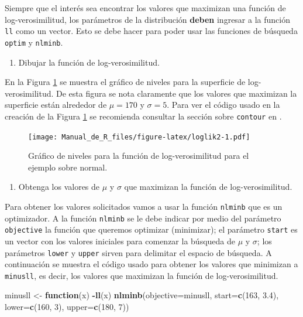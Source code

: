 \documentclass[10pt,]{krantz}
\makeatletter
\newenvironment{Shaded}{\begin{snugshade}}{\end{snugshade}}
\newcommand{\KeywordTok}[1]{\textcolor[rgb]{0.13,0.29,0.53}{\textbf{#1}}}
\newcommand{\DataTypeTok}[1]{\textcolor[rgb]{0.13,0.29,0.53}{#1}}
\newcommand{\DecValTok}[1]{\textcolor[rgb]{0.00,0.00,0.81}{#1}}
\newcommand{\FloatTok}[1]{\textcolor[rgb]{0.00,0.00,0.81}{#1}}
\newcommand{\StringTok}[1]{\textcolor[rgb]{0.31,0.60,0.02}{#1}}
\newcommand{\ControlFlowTok}[1]{\textcolor[rgb]{0.13,0.29,0.53}{\textbf{#1}}}
\newcommand{\OperatorTok}[1]{\textcolor[rgb]{0.81,0.36,0.00}{\textbf{#1}}}
\newcommand{\NormalTok}[1]{#1}
\providecommand{\tightlist}{%
  \setlength{\itemsep}{0pt}\setlength{\parskip}{0pt}}
\newenvironment{kframe}{%
\medskip{}
\setlength{\fboxsep}{.8em}
 \def\at@end@of@kframe{}%
 \ifinner\ifhmode%
  \def\at@end@of@kframe{\end{minipage}}%
  \begin{minipage}{\columnwidth}%
 \fi\fi%
 \def\FrameCommand##1{\hskip\@totalleftmargin \hskip-\fboxsep
 \colorbox{shadecolor}{##1}\hskip-\fboxsep
     \hskip-\linewidth \hskip-\@totalleftmargin \hskip\columnwidth}%
 \MakeFramed {\advance\hsize-\width
   \@totalleftmargin\z@ \linewidth\hsize
   \@setminipage}}%
 {\par\unskip\endMakeFramed%
 \at@end@of@kframe}
\renewenvironment{Shaded}{\begin{kframe}}{\end{kframe}}
\let\BeginKnitrBlock\begin \let\EndKnitrBlock\end
\makeatother
\begin{document}
\BeginKnitrBlock{rmdwarning}
Siempre que el interés sea encontrar los valores que maximizan una
función de log-verosimilitud, los parámetros de la distribución
\textbf{deben} ingresar a la función \texttt{ll} como un vector. Esto se
debe hacer para poder usar las funciones de búsqueda \texttt{optim} y
\texttt{nlminb}.
\EndKnitrBlock{rmdwarning}

\begin{enumerate}
\def\labelenumi{\arabic{enumi})}
\setcounter{enumi}{1}
\tightlist
\item
  Dibujar la función de log-verosimilitud.
\end{enumerate}

En la Figura \ref{fig:loglik2} se muestra el gráfico de niveles para la
superficie de log-verosimilitud. De esta figura se nota claramente que
los valores que maximizan la superficie están alrededor de \(\mu=170\) y
\(\sigma=5\). Para ver el código usado en la creación de la Figura
\ref{fig:loglik2} se recomienda consultar la sección sobre
\texttt{contour} en \citet{hernandez_correa}.

\begin{figure}
\centering
\texttt{[image: Manual\_de\_R\_files/figure-latex/loglik2-1.pdf]}
\caption{\label{fig:loglik2}Gráfico de niveles para la función de
log-verosimilitud para el ejemplo sobre normal.}
\end{figure}

\begin{enumerate}
\def\labelenumi{\arabic{enumi})}
\setcounter{enumi}{2}
\tightlist
\item
  Obtenga los valores de \(\mu\) y \(\sigma\) que maximizan la función
  de log-verosimilitud.
\end{enumerate}

Para obtener los valores solicitados vamos a usar la función
\texttt{nlminb} que es un optimizador. A la función \texttt{nlminb} se
le debe indicar por medio del parámetro \texttt{objective} la función
que queremos optimizar (minimizar); el parámetro \texttt{start} es un
vector con los valores iniciales para comenzar la búsqueda de \(\mu\) y
\(\sigma\); los parámetros \texttt{lower} y \texttt{upper} sirven para
delimitar el espacio de búsqueda. A continuación se muestra el código
usado para obtener los valores que minimizan a \texttt{minusll}, es
decir, los valores que maximizan la función de log-verosimilitud.

\begin{Shaded}
\begin{Highlighting}[]
\NormalTok{minusll <-}\StringTok{ }\ControlFlowTok{function}\NormalTok{(x) }\OperatorTok{-}\KeywordTok{ll}\NormalTok{(x)}
\KeywordTok{nlminb}\NormalTok{(}\DataTypeTok{objective=}\NormalTok{minusll, }\DataTypeTok{start=}\KeywordTok{c}\NormalTok{(}\DecValTok{163}\NormalTok{, }\FloatTok{3.4}\NormalTok{),}
       \DataTypeTok{lower=}\KeywordTok{c}\NormalTok{(}\DecValTok{160}\NormalTok{, }\DecValTok{3}\NormalTok{), }\DataTypeTok{upper=}\KeywordTok{c}\NormalTok{(}\DecValTok{180}\NormalTok{, }\DecValTok{7}\NormalTok{))}
\end{Highlighting}
\end{Shaded}
\end{document}
